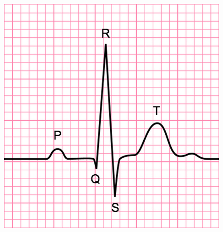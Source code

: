 \documentclass[11pt]{book}
\begin{document}
\includegraphics[width=\textwidth]{figures/lecture17_ecg.png}
\end{document}
